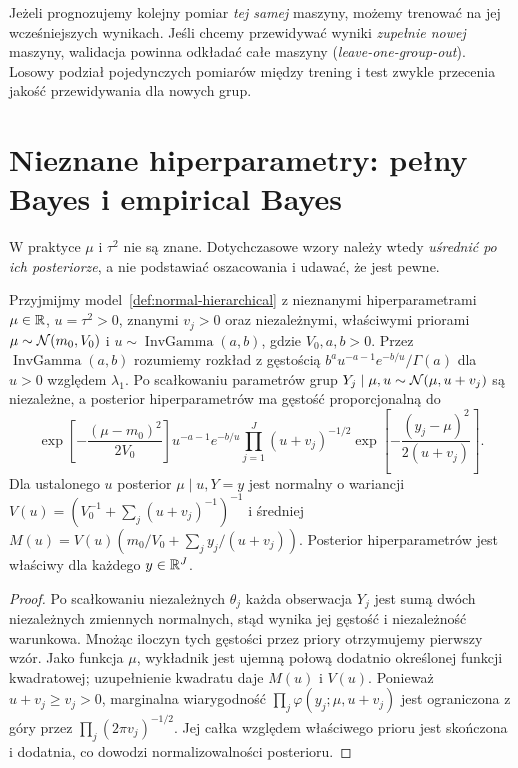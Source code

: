 \begin{uwaga}
Jeżeli prognozujemy kolejny pomiar \emph{tej samej} maszyny,
możemy trenować na jej wcześniejszych wynikach. Jeśli chcemy
przewidywać wyniki \emph{zupełnie nowej} maszyny, walidacja
powinna odkładać całe maszyny (\emph{leave-one-group-out}).
Losowy podział pojedynczych pomiarów między trening i test
zwykle przecenia jakość przewidywania dla nowych grup.
\end{uwaga}

\section{Nieznane hiperparametry: pełny Bayes i empirical Bayes}
W praktyce $\mu$ i $\tau^2$ nie są znane. Dotychczasowe
wzory należy wtedy \emph{uśrednić po ich posteriorze},
a nie podstawiać oszacowania i udawać, że jest pewne.

\begin{twierdzenie}
\label{thm:normal-hyperposterior}
Przyjmijmy model~\ref{def:normal-hierarchical} z nieznanymi
hiperparametrami $\mu\in\mathbb R$, $u=\tau^2>0$, znanymi
$v_j>0$ oraz niezależnymi, właściwymi priorami
$\mu\sim\mathcal N(m_0,V_0)$ i
$u\sim\operatorname{InvGamma}(a,b)$, gdzie $V_0,a,b>0$.
Przez $\operatorname{InvGamma}(a,b)$ rozumiemy rozkład
z gęstością $b^a u^{-a-1}e^{-b/u}/\Gamma(a)$ dla $u>0$
względem $\lambda_1$. Po scałkowaniu parametrów grup
$Y_j\mid\mu,u\sim\mathcal N(\mu,u+v_j)$ są niezależne,
a posterior hiperparametrów ma gęstość proporcjonalną do
\[
 \exp\!\left[-\frac{(\mu-m_0)^2}{2V_0}\right]
 u^{-a-1}e^{-b/u}\prod_{j=1}^J(u+v_j)^{-1/2}
 \exp\!\left[-\frac{(y_j-\mu)^2}{2(u+v_j)}\right].
\]
Dla ustalonego $u$ posterior $\mu\mid u,Y=y$ jest normalny
o wariancji $V(u)=(V_0^{-1}+\sum_j(u+v_j)^{-1})^{-1}$
i średniej
$M(u)=V(u)(m_0/V_0+\sum_jy_j/(u+v_j))$.
Posterior hiperparametrów jest właściwy dla każdego $y\in\mathbb R^J$.
\end{twierdzenie}
\begin{proof}
Po scałkowaniu niezależnych $\theta_j$ każda obserwacja
$Y_j$ jest sumą dwóch niezależnych zmiennych normalnych,
stąd wynika jej gęstość i niezależność warunkowa.
Mnożąc iloczyn tych gęstości przez priory otrzymujemy
pierwszy wzór. Jako funkcja $\mu$, wykładnik jest
ujemną połową dodatnio określonej funkcji kwadratowej;
uzupełnienie kwadratu daje $M(u)$ i $V(u)$.
Ponieważ $u+v_j\ge v_j>0$, marginalna wiarygodność
$\prod_j\varphi(y_j;\mu,u+v_j)$ jest ograniczona
z góry przez $\prod_j(2\pi v_j)^{-1/2}$.
Jej całka względem właściwego prioru jest skończona
i dodatnia, co dowodzi normalizowalności posterioru.
\end{proof}


